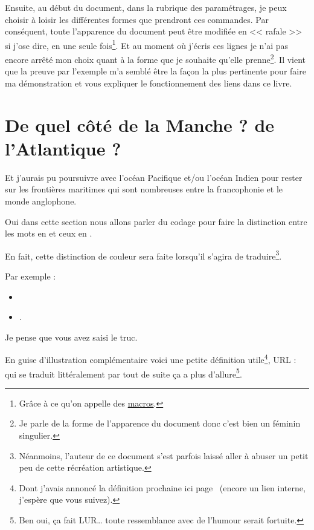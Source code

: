 Ensuite, au début du document, dans la rubrique des paramétrages, je
peux choisir à loisir les différentes formes que prendront ces
commandes. Par conséquent, toute l'apparence du document peut être
modifiée en << rafale >> si j'ose dire, en une seule
fois\footnote{Grâce à ce qu'on appelle des \href{http://www.tuteurs.ens.fr/logiciels/latex/macros.html}{macros}.}. Et au
moment où j'écris ces lignes je n'ai pas encore arrêté mon choix quant
à la forme que je souhaite qu'elle prenne\footnote{Je parle de la
  forme de l'apparence du document donc c'est bien un féminin
  singulier.}. Il vient que la preuve par l'exemple m'a semblé être la
façon la plus pertinente pour faire ma démonstration et vous expliquer le fonctionnement des liens dans ce livre.

\newpage

\section{De quel côté de la Manche ? de l'Atlantique ?}\label{sec:side}

Et j'aurais pu poursuivre avec l'océan Pacifique et/ou l'océan Indien
pour rester sur les frontières maritimes qui sont nombreuses entre la
francophonie et le monde anglophone.

Oui dans cette section nous allons parler du codage pour faire la
distinction entre les mots en  et ceux en .

En fait, cette distinction de couleur sera faite lorsqu'il s'agira de
traduire\footnote{Néanmoins, l'auteur de ce document s'est parfois 
  laissé aller à abuser un petit peu de cette récréation artistique.}.

Par exemple :
\begin{itemize}
\item {}
\item {}.  
\end{itemize}

Je pense que vous avez saisi le truc.

En guise d'illustration complémentaire voici une petite définition
utile\footnote{Dont j'avais annoncé la définition prochaine ici
  page~\pageref{sec:link} (encore un lien interne, j'espère que vous
  suivez).}, URL :  qui se traduit
littéralement par  tout de
suite ça a plus d'allure\footnote{Ben oui, ça fait LUR\dots\xspace toute
  ressemblance avec de l'humour serait fortuite.}.

